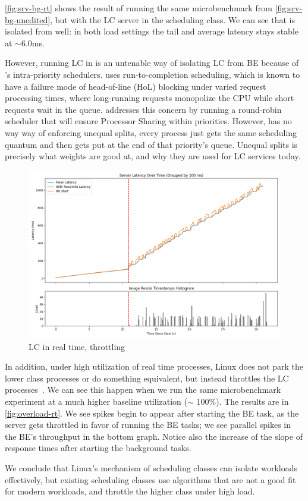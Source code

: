 \autoref{fig:srv-bg-rt} shows the result of running the same microbenchmark from
\autoref{fig:srv-bg-unedited}, but with the LC server in the \rtclass{}
scheduling class. We can see that \rtclass{} is isolated from \normalclass{}
well: in both load settings the tail and average latency stays stable at
$\sim$6.0ms.

However, running LC in \rtclass{} is an untenable way of isolating LC from BE
because of \rtclass{}'s intra-priority schedulers. \schedfifo{} uses
run-to-completion scheduling, which is known to have a failure mode of
head-of-line (HoL) blocking under varied request processing times, where
long-running requests monopolize the CPU while short requests wait in the queue.
\schedrr{} addresses this concern by running a round-robin scheduler that will
ensure Processor Sharing within priorities. However, \schedrr{} has no way way
of enforcing unequal splits, every process just gets the same scheduling quantum
and then gets put at the end of that priority's queue. Unequal splits is
precisely what weights are good at, and why they are used for LC services today.


\begin{figure}[t]
    \centering
    \includegraphics[width=\columnwidth]{graphs/overload-rt.png}
    \caption{LC in real time, throttling}\label{fig:overload-rt}
\end{figure}

In addition, under high utilization of real time processes, Linux does not park
the lower class processes or do something equivalent, but instead throttles the
\rtclass{} LC processes~\cite{lkml-deadline-srv}. We can see this happen when
we run the same microbenchmark experiment at a much higher baseline utilization
($\sim$ 100\%). The results are in \autoref{fig:overload-rt}. We see spikes
begin to appear after starting the BE task, as the \rtclass{} server gets
throttled in favor of running the BE tasks; we see parallel spikes in the BE's
throughput in the bottom graph. Notice also the increase of the slope of response
times after starting the background tasks.

We conclude that Linux's mechanism of scheduling classes can isolate workloads
effectively, but existing scheduling classes use algorithms that are not a good
fit for modern workloads, and throttle the higher class under high load.







